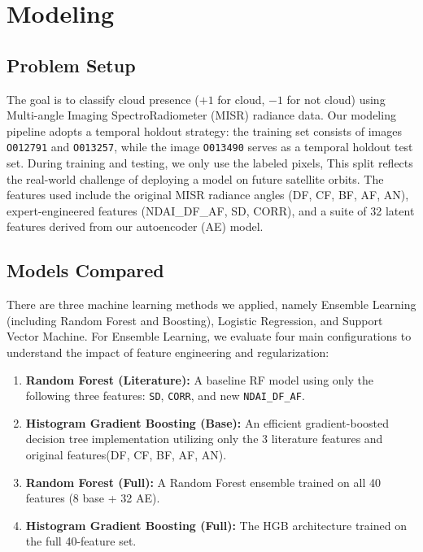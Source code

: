 \section{Modeling}

\subsection{Problem Setup}
The goal is to classify cloud presence ($+1$ for cloud, $-1$ for not cloud) using Multi-angle Imaging SpectroRadiometer (MISR) radiance data. Our modeling pipeline adopts a temporal holdout strategy: the training set consists of images \texttt{O012791} and \texttt{O013257}, while the image \texttt{O013490} serves as a temporal holdout test set. 
During training and testing, we only use the labeled pixels, 
This split reflects the real-world challenge of deploying a model on future satellite orbits. The features used include the original MISR radiance angles (DF, CF, BF, AF, AN), expert-engineered features (NDAI\_DF\_AF, SD, CORR), and a suite of 32 latent features derived from our autoencoder (AE) model.

\subsection{Models Compared}
There are three machine learning methods we applied, namely Ensemble Learning (including Random Forest and Boosting), Logistic Regression, and Support Vector Machine. For Ensemble Learning, we evaluate four main configurations to understand the impact of feature engineering and regularization:
\begin{enumerate}
    \item \textbf{Random Forest (Literature):} A baseline RF model using only the following three features: \texttt{SD}, \texttt{CORR}, and new \texttt{NDAI\_DF\_AF}.
    \item \textbf{Histogram Gradient Boosting (Base):} An efficient gradient-boosted decision tree implementation utilizing only the 3 literature features and original features(DF, CF, BF, AF, AN).
    \item \textbf{Random Forest (Full):} A Random Forest ensemble trained on all 40 features (8 base + 32 AE).
    \item \textbf{Histogram Gradient Boosting (Full):} The HGB architecture trained on the full 40-feature set.
\end{enumerate}

